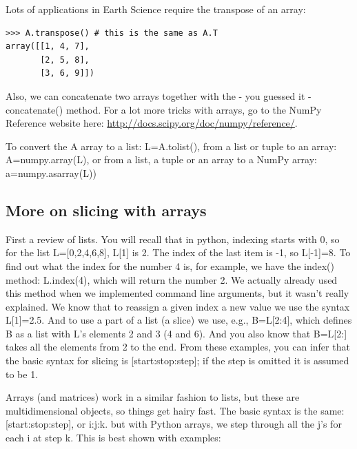 \documentclass[11pt]{book}
\begin{document}
{Lots of applications in Earth Science require the transpose of an array:
{ \color{blue} \begin{verbatim}
>>> A.transpose() # this is the same as A.T  
array([[1, 4, 7],
       [2, 5, 8],
       [3, 6, 9]])
\end{verbatim}}

Also, we can concatenate two arrays together with the - you guessed it - {\color{blue}concatenate()} method.   For a lot more tricks with arrays, go to the NumPy Reference website here:  \url{http://docs.scipy.org/doc/numpy/reference/}.   


To convert the {\color{blue}A} array to a list:   {\color{blue}L=A.tolist()},  from a list or tuple to an array:   {\color{blue}A=numpy.array(L)}, or from a list, a tuple or an array to a NumPy array:   {\color{blue}a=numpy.asarray(L))}

\subsection {More on slicing with arrays}



First a review of lists.   You will recall that in  python, indexing starts with 0, so for the list {\color{blue} L=[0,2,4,6,8], L[1]} is 2. The index of the last item is -1, so  {\color{blue}L[-1]}=8.  To find out what the index for the number 4 is, for example, we have the {\color{blue}index()} method:  {\color{blue}L.index(4}), which will return the number 2. We actually already used this method when we implemented command line arguments, but it wasn't really explained.   We know that to reassign a given index a new value we use the syntax {\color{blue}L[1]=2.5}.  
And to use a part of a list (a slice) we use, e.g.,    {\color{blue}B=L[2:4]}, which  defines  {\color{blue}B} as a list with  {\color{blue}L}'s elements 2 and 3 (4 and 6).  And you also know that  {\color{blue}B=L[2:]} takes all the elements from 2 to the end.  
From these examples, you can infer that the basic syntax for slicing is  {\color{blue}[start:stop:step]}; if the step is omitted it is assumed to be 1.  

Arrays (and matrices) work in a similar fashion to lists, but these are multidimensional objects, so things get hairy fast.
The basic syntax is the same:  {\color{blue}[start:stop:step]},  or  {\color{blue}i:j:k}.   but with Python arrays, we step through all the  {\color{blue}j}'s for each  {\color{blue}i}  at step  {\color{blue}k}.  This is best shown with examples:


}
\end{document}
